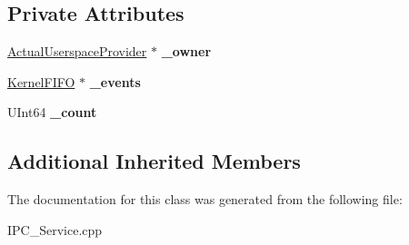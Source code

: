 \subsection*{Private Attributes}
\begin{DoxyCompactItemize}
\item 
\mbox{\label{class_i_p_c___service_1_1_userspace_provider_a19fa3114bafefc190468997cd51dfdaf}} 
\hyperlink{class_i_p_c___service_1_1_actual_userspace_provider}{Actual\+Userspace\+Provider} $\ast$ {\bfseries \+\_\+owner}
\item 
\mbox{\label{class_i_p_c___service_1_1_userspace_provider_ae03a4f5a4d7499521c13596128dda582}} 
\hyperlink{class_kernel_f_i_f_o}{Kernel\+F\+I\+FO} $\ast$ {\bfseries \+\_\+events}
\item 
\mbox{\label{class_i_p_c___service_1_1_userspace_provider_ab9fd21be143b424c5d35a6596973e047}} 
U\+Int64 {\bfseries \+\_\+count}
\end{DoxyCompactItemize}
\subsection*{Additional Inherited Members}


The documentation for this class was generated from the following file\+:\begin{DoxyCompactItemize}
\item 
I\+P\+C\+\_\+\+Service.\+cpp\end{DoxyCompactItemize}
